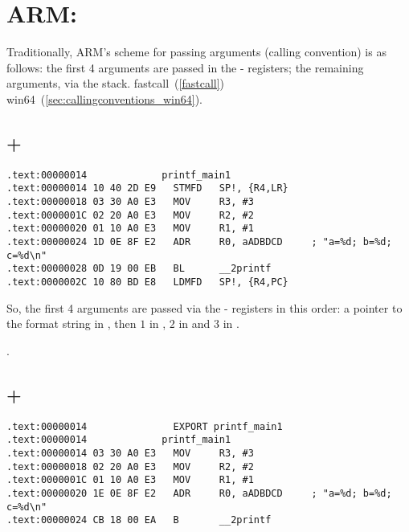 \section{ARM: }

{Traditionally, ARM's scheme for passing arguments (calling convention) is as follows:
the first 4 arguments are passed in the - registers; the remaining arguments, via the stack}.
fastcall~(\ref{fastcall}) \OrENRU win64~(\ref{sec:callingconventions_win64}).

\subsection{\NonOptimizingKeil + \ARMMode}

\begin{lstlisting}[caption=\NonOptimizingKeil + \ARMMode]
.text:00000014             printf_main1
.text:00000014 10 40 2D E9   STMFD   SP!, {R4,LR}
.text:00000018 03 30 A0 E3   MOV     R3, #3
.text:0000001C 02 20 A0 E3   MOV     R2, #2
.text:00000020 01 10 A0 E3   MOV     R1, #1
.text:00000024 1D 0E 8F E2   ADR     R0, aADBDCD     ; "a=%d; b=%d; c=%d\n"
.text:00000028 0D 19 00 EB   BL      __2printf
.text:0000002C 10 80 BD E8   LDMFD   SP!, {R4,PC}
\end{lstlisting}

{So, the first 4 arguments are passed via the - registers in this order:
a pointer to the \printf format string in 
, then $1$ in , $2$ in  and $3$ in }.

.

\subsection{\OptimizingKeil + \ARMMode}
\label{ARM_B_to_printf}

\begin{lstlisting}[caption=\OptimizingKeil + \ARMMode]
.text:00000014               EXPORT printf_main1
.text:00000014             printf_main1
.text:00000014 03 30 A0 E3   MOV     R3, #3
.text:00000018 02 20 A0 E3   MOV     R2, #2
.text:0000001C 01 10 A0 E3   MOV     R1, #1
.text:00000020 1E 0E 8F E2   ADR     R0, aADBDCD     ; "a=%d; b=%d; c=%d\n"
.text:00000024 CB 18 00 EA   B       __2printf
\end{lstlisting}

